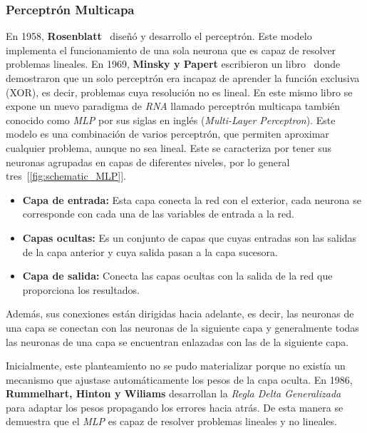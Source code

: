 
\subsubsection{Perceptrón Multicapa}
\label{sec:mlp}

En 1958, \textbf{Rosenblatt}~\cite{rosenblatt1960perceptron} diseñó y desarrollo el perceptrón. Este modelo implementa el funcionamiento de una sola neurona que es capaz de resolver problemas lineales. En 1969, \textbf{Minsky y Papert} escribieron un libro~\cite{minsky2017perceptrons} donde demostraron que un solo perceptrón era incapaz de aprender la función exclusiva (XOR), es decir, problemas cuya resolución no es lineal. En este mismo libro se expone un nuevo paradigma de \textit{RNA} llamado perceptrón multicapa  también conocido como \textit{MLP} por sus siglas en inglés (\textit{Multi-Layer Perceptron}). Este modelo es una combinación de varios perceptrón, que permiten aproximar cualquier problema, aunque no sea lineal. Este se caracteriza por tener sus neuronas agrupadas en capas de diferentes niveles, por lo general tres~[\cref{fig:schematic_MLP}].

\begin{itemize}
    \item \textbf{Capa de entrada:} Esta capa conecta la red con el exterior, cada neurona se corresponde con cada una de las variables de entrada a la red.

    \item \textbf{Capas ocultas:} Es un conjunto de capas que cuyas entradas son las salidas de la capa anterior y cuya salida pasan a la capa sucesora.

    \item \textbf{Capa de salida:} Conecta las capas ocultas con la salida de la red que proporciona los resultados.
\end{itemize}

Además, sus conexiones están dirigidas hacia adelante, es decir, las neuronas de una capa se conectan con las neuronas de la siguiente capa y generalmente todas las neuronas de una capa se encuentran enlazadas con las de la siguiente capa.



Inicialmente, este planteamiento no se pudo materializar porque no existía un mecanismo que ajustase automáticamente los pesos de la capa oculta. En 1986, \textbf{Rummelhart, Hinton y Wiliams} desarrollan la \textit{Regla Delta Generalizada}~\cite{rumelhart1988learning} para adaptar los pesos propagando los errores hacia atrás. De esta manera se demuestra que el \textit{MLP} es capaz de resolver problemas lineales y no lineales.

